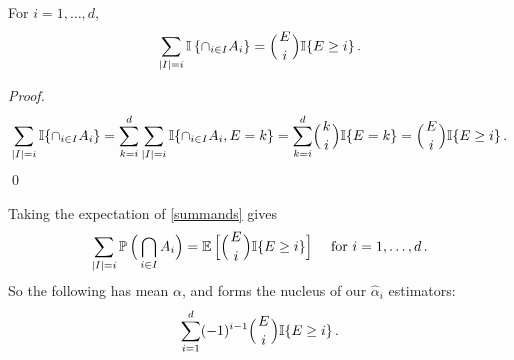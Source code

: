 \begin{Proposition} \label{prop:means_of_binomial}
For $i = 1,\dots, d$,
\begin{equation} \label{summands} 
  \sum_{|I|=i} \mathbb I\left\{\cap_{i\in I}A_i\right\} = \Bigl({{E}\atop i}\Bigr) \mathbb I\{E \ge i\}  \,.
\end{equation}
\end{Proposition}
\begin{proof}
\begin{align*}
\sum_{|I|=i} \mathbb I\{ \cap_{i\in I}A_i \} =
\sum_{k=i}^{d} \sum_{|I|=i} \mathbb I\{ \cap_{i\in I}A_i, E = k \} = \sum_{k=i}^{d} \Bigl({{k}\atop i}\Bigr) \mathbb I\{E = k \} = \Bigl({{E}\atop i}\Bigr) \mathbb I\{E \ge i\} \,.
\end{align*} 
\qed 
\end{proof}
Taking the expectation of \eqref{summands} gives
\begin{equation*} 
 \sum_{|I|=i} \operatorname{{\mathbb P}}\Big(\bigcap_{i\in I}A_i\Big) = \operatorname{{\mathbb E}}\Big[ \Bigl({{E}\atop i}\Bigr) \mathbb I\{E \ge i\} \Big] \quad \text{ for } i=1,\dots,d \,.
\end{equation*}
So the following has mean $\alpha$, and forms the nucleus of our $\hat{\alpha}_i$ estimators:
\begin{equation} \label{estimator_incl_excl}
	\sum_{i=1}^d (-1)^{i-1} \Bigl({{E}\atop i}\Bigr) \mathbb I\{E\ge i\} \,.
\end{equation}

